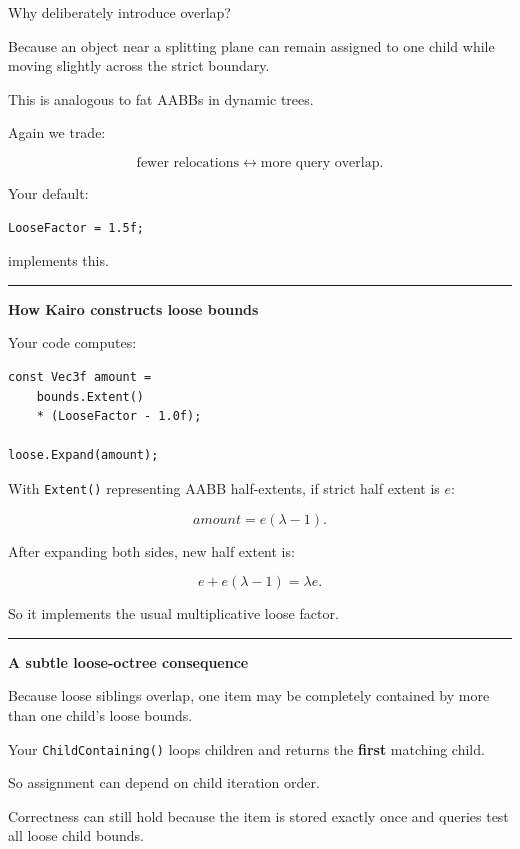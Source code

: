 Why deliberately introduce overlap?

Because an object near a splitting plane can remain assigned to one child while moving slightly across the strict boundary.

This is analogous to fat AABBs in dynamic trees.

Again we trade:

\[
\text{fewer relocations}
\leftrightarrow
\text{more query overlap}.
\]

Your default:

\begin{verbatim}
LooseFactor = 1.5f;
\end{verbatim}

implements this.

\begin{center}\rule{0.5\linewidth}{0.5pt}\end{center}

\textbf{How Kairo constructs loose bounds}

Your code computes:

\begin{verbatim}
const Vec3f amount =
    bounds.Extent()
    * (LooseFactor - 1.0f);

loose.Expand(amount);
\end{verbatim}

With \texttt{Extent()} representing AABB half-extents, if strict half extent is \(e\):

\[
amount=e(\lambda-1).
\]

After expanding both sides, new half extent is:

\[
e+e(\lambda-1)
=
\lambda e.
\]

So it implements the usual multiplicative loose factor.

\begin{center}\rule{0.5\linewidth}{0.5pt}\end{center}

\textbf{A subtle loose-octree consequence}

Because loose siblings overlap, one item may be completely contained by more than one child's loose bounds.

Your \texttt{ChildContaining()} loops children and returns the \textbf{first} matching child.

So assignment can depend on child iteration order.

Correctness can still hold because the item is stored exactly once and queries test all loose child bounds.

